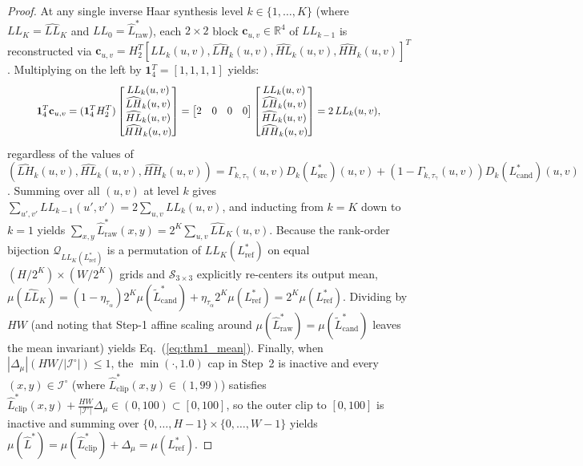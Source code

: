 \documentclass[conference,10pt]{IEEEtran}
\begin{document}
\begin{proof}
At any single inverse Haar synthesis level $k \in \{1, \dots, K\}$ (where $LL_K = \widehat{LL}_K$ and $LL_0 = \widehat{L}^*_{\text{raw}}$), each $2\times 2$ block $\mathbf{c}_{u,v} \in \mathbb{R}^4$ of $LL_{k-1}$ is reconstructed via $\mathbf{c}_{u,v} = H_2^T [LL_{k}(u,v), \widehat{LH}_k(u,v), \widehat{HL}_k(u,v), \widehat{HH}_k(u,v)]^T$. Multiplying on the left by $\mathbf{1}_4^T = [1, 1, 1, 1]$ yields:
\begin{equation}
\resizebox{0.89\columnwidth}{!}{$\displaystyle
\mathbf{1}_4^T \mathbf{c}_{u,v} = (\mathbf{1}_4^T H_2^T) \begin{bmatrix} LL_{k}(u,v) \\ \widehat{LH}_k(u,v) \\ \widehat{HL}_k(u,v) \\ \widehat{HH}_k(u,v) \end{bmatrix}
= \begin{bmatrix} 2 & 0 & 0 & 0 \end{bmatrix} \begin{bmatrix} LL_{k}(u,v) \\ \widehat{LH}_k(u,v) \\ \widehat{HL}_k(u,v) \\ \widehat{HH}_k(u,v) \end{bmatrix}
= 2\, LL_{k}(u,v),
$}
\end{equation}
regardless of the values of $(\widehat{LH}_k(u,v), \widehat{HL}_k(u,v), \widehat{HH}_k(u,v)) = \Gamma_{k,\tau_\gamma}(u,v) D_k(L^*_{\text{src}})(u,v) + (1 - \Gamma_{k,\tau_\gamma}(u,v)) D_k(L^*_{\text{cand}})(u,v)$. Summing over all $(u,v)$ at level $k$ gives $\sum_{u',v'} LL_{k-1}(u',v') = 2 \sum_{u,v} LL_k(u,v)$, and inducting from $k=K$ down to $k=1$ yields $\sum_{x,y} \widehat{L}^*_{\text{raw}}(x,y) = 2^K \sum_{u,v} \widehat{LL}_K(u,v)$. Because the rank-order bijection $\mathcal{Q}_{LL_K(L^*_{\text{ref}})}$ is a permutation of $LL_K(L^*_{\text{ref}})$ on equal $(H/2^K)\times(W/2^K)$ grids and $\mathcal{S}_{3\times 3}$ explicitly re-centers its output mean, $\mu(\widehat{LL}_K) = (1-\eta_{\tau_\alpha})2^K\mu(\widetilde{L}^*_{\text{cand}}) + \eta_{\tau_\alpha} 2^K\mu(L^*_{\text{ref}}) = 2^K \mu(L^*_{\text{ref}})$. Dividing by $HW$ (and noting that Step-1 affine scaling around $\mu(\widehat{L}^*_{\text{raw}}) = \mu(\widetilde{L}^*_{\text{cand}})$ leaves the mean invariant) yields Eq.~(\ref{eq:thm1_mean}). Finally, when $|\Delta_\mu|(HW/|\mathcal{I}^\circ|) \le 1$, the $\min(\cdot, 1.0)$ cap in Step~2 is inactive and every $(x,y) \in \mathcal{I}^\circ$ (where $\widehat{L}^*_{\text{clip}}(x,y) \in (1, 99)$) satisfies $\widehat{L}^*_{\text{clip}}(x,y) + \frac{HW}{|\mathcal{I}^\circ|}\Delta_\mu \in (0, 100) \subset [0, 100]$, so the outer $\mathrm{clip}$ to $[0, 100]$ is inactive and summing over $\{0,\dots,H-1\}\times\{0,\dots,W-1\}$ yields $\mu(\widehat{L}^*) = \mu(\widehat{L}^*_{\text{clip}}) + \Delta_\mu = \mu(L^*_{\text{ref}})$.
\end{proof}
\end{document}
